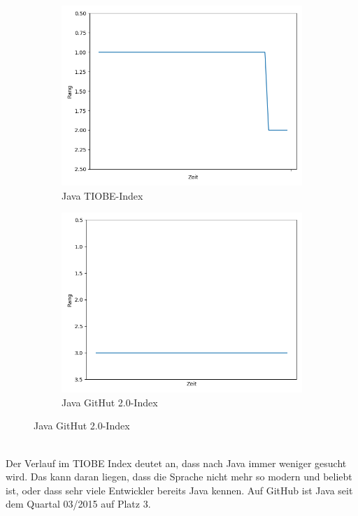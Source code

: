 \documentclass[ngerman]{article}
\begin{document}
    \begin{figure}[h!]
        \begin{subfigure}[h!]{.5\textwidth}
            \caption{Java TIOBE-Index}
            \centering
            \includegraphics[scale=.25]{JavaTIOBE.png}
        \end{subfigure}
        \begin{subfigure}[h!]{.5\textwidth}
            \caption{Java GitHut 2.0-Index}
            \centering
            \includegraphics[scale=.25]{JavaGitHut.png}
        \end{subfigure}
    \end{figure}\\
    Der Verlauf im TIOBE Index deutet an, dass nach Java immer weniger gesucht wird. Das kann daran liegen, dass die Sprache nicht mehr so modern und beliebt ist, oder dass sehr viele Entwickler bereits Java kennen. Auf GitHub ist Java seit dem Quartal 03/2015 auf Platz 3.\\
\end{document}
